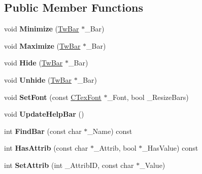 \subsection*{Public Member Functions}
\begin{DoxyCompactItemize}
\item 
\hypertarget{struct_c_tw_mgr_a7bebf31e049b167a64337eaa69e54e87}{void {\bfseries Minimize} (\hyperlink{struct_c_tw_bar}{Tw\+Bar} $\ast$\+\_\+\+Bar)}\label{struct_c_tw_mgr_a7bebf31e049b167a64337eaa69e54e87}

\item 
\hypertarget{struct_c_tw_mgr_af6be3736d1d79c35ae6622e4cbf5ed31}{void {\bfseries Maximize} (\hyperlink{struct_c_tw_bar}{Tw\+Bar} $\ast$\+\_\+\+Bar)}\label{struct_c_tw_mgr_af6be3736d1d79c35ae6622e4cbf5ed31}

\item 
\hypertarget{struct_c_tw_mgr_ac7ace44f69594ef657139794b040953d}{void {\bfseries Hide} (\hyperlink{struct_c_tw_bar}{Tw\+Bar} $\ast$\+\_\+\+Bar)}\label{struct_c_tw_mgr_ac7ace44f69594ef657139794b040953d}

\item 
\hypertarget{struct_c_tw_mgr_a15f0eb1bbb3f0fa76dd26fb9207fdb35}{void {\bfseries Unhide} (\hyperlink{struct_c_tw_bar}{Tw\+Bar} $\ast$\+\_\+\+Bar)}\label{struct_c_tw_mgr_a15f0eb1bbb3f0fa76dd26fb9207fdb35}

\item 
\hypertarget{struct_c_tw_mgr_a16c9c87edd07afbba0c3e3c03ba0d5ec}{void {\bfseries Set\+Font} (const \hyperlink{struct_c_tex_font}{C\+Tex\+Font} $\ast$\+\_\+\+Font, bool \+\_\+\+Resize\+Bars)}\label{struct_c_tw_mgr_a16c9c87edd07afbba0c3e3c03ba0d5ec}

\item 
\hypertarget{struct_c_tw_mgr_a978d3ddf82446744b357ae6ba8efa760}{void {\bfseries Update\+Help\+Bar} ()}\label{struct_c_tw_mgr_a978d3ddf82446744b357ae6ba8efa760}

\item 
\hypertarget{struct_c_tw_mgr_a11555db8e902a868f4e266ef2f512a38}{int {\bfseries Find\+Bar} (const char $\ast$\+\_\+\+Name) const }\label{struct_c_tw_mgr_a11555db8e902a868f4e266ef2f512a38}

\item 
\hypertarget{struct_c_tw_mgr_a5972a72ec5c52c6b4e610477a4795e32}{int {\bfseries Has\+Attrib} (const char $\ast$\+\_\+\+Attrib, bool $\ast$\+\_\+\+Has\+Value) const }\label{struct_c_tw_mgr_a5972a72ec5c52c6b4e610477a4795e32}

\item 
\hypertarget{struct_c_tw_mgr_ad822a5e806a18dbadf2fdbece3c0e740}{int {\bfseries Set\+Attrib} (int \+\_\+\+Attrib\+I\+D, const char $\ast$\+\_\+\+Value)}\label{struct_c_tw_mgr_ad822a5e806a18dbadf2fdbece3c0e740}


\end{DoxyCompactItemize}
